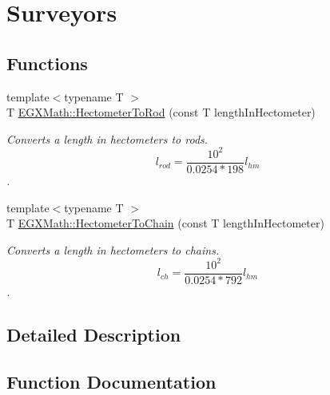 \hypertarget{group___e_g_x_math-_conversions-_length_conversions-_hectometer-_surveyors}{}\section{Surveyors}
\label{group___e_g_x_math-_conversions-_length_conversions-_hectometer-_surveyors}
\subsection*{Functions}
\begin{DoxyCompactItemize}
\item 
{\footnotesize template$<$typename T $>$ }\\T \mbox{\hyperlink{group___e_g_x_math-_conversions-_length_conversions-_hectometer-_surveyors_gafdf1df626e4b3c88f88bd3d6d3545e7d}{E\+G\+X\+Math\+::\+Hectometer\+To\+Rod}} (const T length\+In\+Hectometer)
\begin{DoxyCompactList}\small\item\em Converts a length in hectometers to rods. \[ l_{rod}= \frac{10^{2}}{0.0254 * 198} l_{hm} \]. \end{DoxyCompactList}\item 
{\footnotesize template$<$typename T $>$ }\\T \mbox{\hyperlink{group___e_g_x_math-_conversions-_length_conversions-_hectometer-_surveyors_ga02973091150445cfe5798389ecccdceb}{E\+G\+X\+Math\+::\+Hectometer\+To\+Chain}} (const T length\+In\+Hectometer)
\begin{DoxyCompactList}\small\item\em Converts a length in hectometers to chains. \[ l_{ch}= \frac{10^{2}}{0.0254 * 792} l_{hm} \]. \end{DoxyCompactList}\end{DoxyCompactItemize}


\subsection{Detailed Description}


\subsection{Function Documentation}
\mbox{\label{group___e_g_x_math-_conversions-_length_conversions-_hectometer-_surveyors_ga02973091150445cfe5798389ecccdceb}} 
